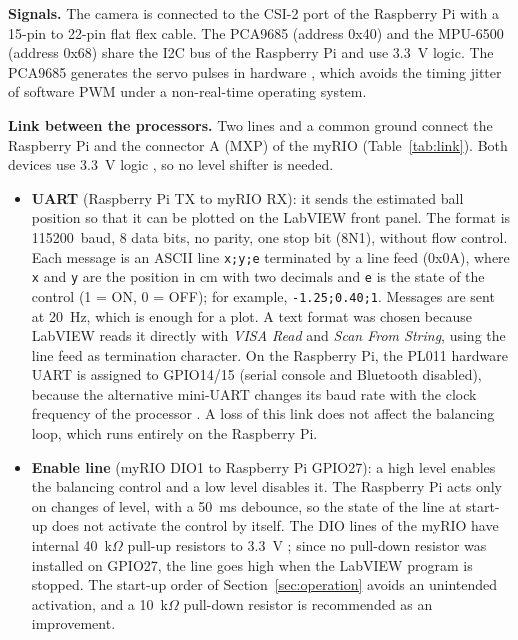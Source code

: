 \documentclass[11pt,letterpaper]{article}
\begin{document}
\textbf{Signals.} The camera is connected to the CSI-2 port of the
Raspberry Pi with a 15-pin to 22-pin flat flex cable. The PCA9685
(address 0x40) and the MPU-6500 (address 0x68) share the I2C bus of the
Raspberry Pi and use 3.3~V logic. The PCA9685 generates the servo pulses
in hardware \cite{PCA9685}, which avoids the timing jitter of software
PWM under a non-real-time operating system.

\textbf{Link between the processors.} Two lines and a common ground
connect the Raspberry Pi and the connector A (MXP) of the myRIO
(Table~\ref{tab:link}). Both devices use 3.3~V logic \cite{myRIO}, so no
level shifter is needed.
\begin{itemize}
    \item \textbf{UART} (Raspberry Pi TX to myRIO RX): it sends the
    estimated ball position so that it can be plotted on the LabVIEW
    front panel. The format is 115200~baud, 8 data bits, no parity, one
    stop bit (8N1), without flow control. Each message is an ASCII line
    \texttt{x;y;e} terminated by a line feed (0x0A), where \texttt{x} and
    \texttt{y} are the position in cm with two decimals and \texttt{e}
    is the state of the control (1 = ON, 0 = OFF); for example,
    \texttt{-1.25;0.40;1}. Messages are sent at 20~Hz, which is enough
    for a plot. A text format was chosen because LabVIEW reads it
    directly with \textit{VISA Read} and \textit{Scan From String}, using
    the line feed as termination character. On the Raspberry Pi, the
    PL011 hardware UART is assigned to GPIO14/15 (serial console and
    Bluetooth disabled), because the alternative mini-UART changes its
    baud rate with the clock frequency of the processor \cite{RPiUART}. A
    loss of this link does not affect the balancing loop, which runs
    entirely on the Raspberry Pi.
    \item \textbf{Enable line} (myRIO DIO1 to Raspberry Pi GPIO27): a high
    level enables the balancing control and a low level disables it. The
    Raspberry Pi acts only on changes of level, with a 50~ms debounce, so
    the state of the line at start-up does not activate the control by
    itself. The DIO lines of the myRIO have internal 40~k$\Omega$ pull-up
    resistors to 3.3~V \cite{myRIO}; since no pull-down resistor was
    installed on GPIO27, the line goes high when the LabVIEW program is
    stopped. The start-up order of Section~\ref{sec:operation} avoids an
    unintended activation, and a 10~k$\Omega$ pull-down resistor is
    recommended as an improvement.
\end{itemize}
\end{document}
